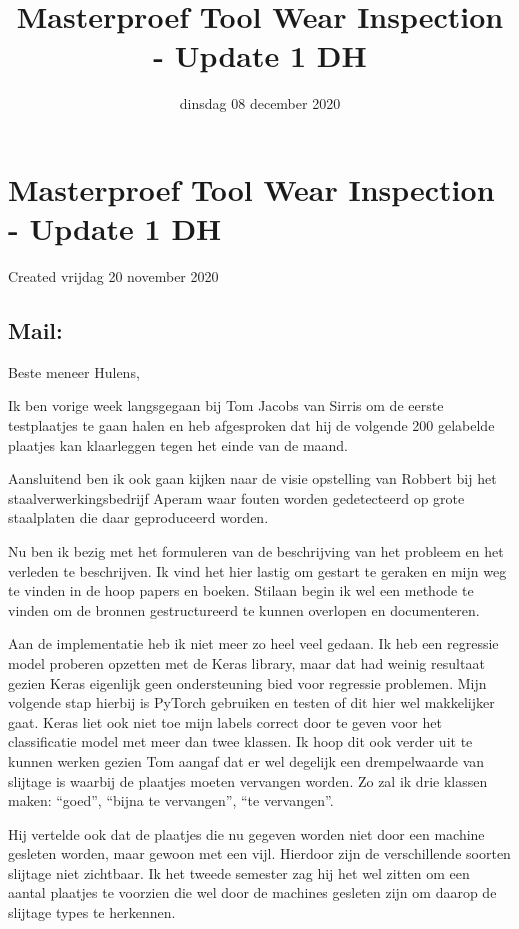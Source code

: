 \documentclass{scrartcl}
\title{Masterproef Tool Wear Inspection - Update 1 DH}
\date{dinsdag 08 december 2020}
\author{}
\begin{document}
\maketitle

		\section{Masterproef Tool Wear Inspection - Update 1 DH}

Created vrijdag 20 november 2020





\subsection{Mail:}

Beste meneer Hulens,

 

Ik ben vorige week langsgegaan bij Tom Jacobs van Sirris om de eerste testplaatjes te gaan halen en heb afgesproken dat hij de volgende 200 gelabelde plaatjes kan klaarleggen tegen het einde van de maand.

Aansluitend ben ik ook gaan kijken naar de visie opstelling van Robbert bij het staalverwerkingsbedrijf Aperam waar fouten worden gedetecteerd op grote staalplaten die daar geproduceerd worden.

 

Nu ben ik bezig met het formuleren van de beschrijving van het probleem en het verleden te beschrijven. Ik vind het hier lastig om gestart te geraken en mijn weg te vinden in de hoop papers en boeken. Stilaan begin ik wel een methode te vinden om de bronnen gestructureerd te kunnen overlopen en documenteren.

 

Aan de implementatie heb ik niet meer zo heel veel gedaan. Ik heb een regressie model proberen opzetten met de Keras library, maar dat had weinig resultaat gezien Keras eigenlijk geen ondersteuning bied voor regressie problemen. Mijn volgende stap hierbij is PyTorch gebruiken en testen of dit hier wel makkelijker gaat. Keras liet ook niet toe mijn labels correct door te geven voor het classificatie model met meer dan twee klassen. Ik hoop dit ook verder uit te kunnen werken gezien Tom aangaf dat er wel degelijk een drempelwaarde van slijtage is waarbij de plaatjes moeten vervangen worden. Zo zal ik drie klassen maken: {“goed”, “bijna te vervangen”, “te vervangen”}.

Hij vertelde ook dat de plaatjes die nu gegeven worden niet door een machine gesleten worden, maar gewoon met een vijl. Hierdoor zijn de verschillende soorten slijtage niet zichtbaar. Ik het tweede semester zag hij het wel zitten om een aantal plaatjes te voorzien die wel door de machines gesleten zijn om daarop de slijtage types te herkennen.
\end{document}
